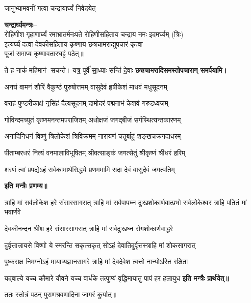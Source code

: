 \begin{center}
{जानुभ्यामवनीं गत्वा चन्द्रायार्घ्यं निवेदयेत्}

\textbf{चन्द्रार्घ्यमन्त्रः–}\\
{रोहिणीश गृहाणार्घ्यं रमाभ्रातर्मनःपते}
रोहिणीसहिताय चन्द्राय नमः इदमर्घ्यम् (त्रिः)\\

इत्यर्घ्यं दत्वा देवकीसहिताय कृष्णाय छत्रचामराद्युपचारं कृत्वा\\पूजां समाप्य कृष्णावतारघट्टं पठेत्॥

{ते ह॒ नाकं॑ महि॒मान॑ सचन्ते। यत्र॒ पूर्वे॑ सा॒ध्याः सन्ति॑ दे॒वाः}
\textbf{\devAya{} छत्त्रचामरादिसमस्तोपचारान् समर्पयामि।}
\medskip

\twolineshloka
{अनघं वामनं शौरिं वैकुण्ठं पुरुषोत्तमम्}
{वासुदेवं हृषीकेशं माधवं मधुसूदनम्}

\twolineshloka
{वराहं पुण्डरीकाक्षं नृसिंहं दैत्यसूदनम्}
{दामोदरं पद्मनाभं केशवं गरुडध्वजम्}

\twolineshloka
{गोविन्दमच्युतं कृष्णमनन्तमपराजितम्}
{अधोक्षजं जगद्बीजं सर्गस्थित्यन्तकारणम्}

\twolineshloka
{अनादिनिधनं विष्णुं त्रिलोकेशं त्रिविक्रमम्}
{नारायणं चतुर्बाहुं शङ्खचक्रगदाधरम्}

\twolineshloka
{पीताम्बरधरं नित्यं वनमालाविभूषितम्}
{श्रीवत्साङ्कं जगत्सेतुं श्रीकृष्णं श्रीधरं हरिम्}

\twolineshloka
{शरणं त्वां प्रपद्येऽहं सर्वकामार्थसिद्धये}
{प्रणममामि सदा देवं वासुदेवं जगत्पतिम्}

\textbf{इति मन्त्रैः प्रणम्य॥}


\resetShloka
\threelineshloka
{त्राहि मां सर्वलोकेश हरे संसारसागरात्}
{त्राहि मां सर्वपापघ्न दुःखशोकार्णवात्प्रभो}
{सर्वलोकेश्वर त्राहि पतितं मां भवार्णवे}

\twolineshloka
{देवकीनन्दन श्रीश हरे संसारसागरात्}
{त्राहि मां सर्वदुःखघ्न रोगशोकार्णवाद्धरे}

\twolineshloka
{दुर्वृत्तात्त्रायसे विष्णो ये स्मरन्ति सकृत्सकृत्}
{सोऽहं देवातिदुर्वृत्तस्त्राहि मां शोकसागरात्}

\twolineshloka
{पुष्कराक्ष निमग्नोऽहं मायाव्यज्ञानसागरे}
{त्राहि मां देवदेवेश त्वत्तो नान्योऽस्ति रक्षिता}

\twolineshloka
{यद्बाल्ये यच्च कौमारे यौवने यच्च वार्धके}
{तत्पुण्यं वृद्धिमायातु पापं हर हलायुध}
\textbf{इति मन्त्रैः प्रार्थयेत्॥}

ततः स्तोत्रं पठन् पुराणश्रवणादिना जागरं कुर्यात्॥


\end{center}
